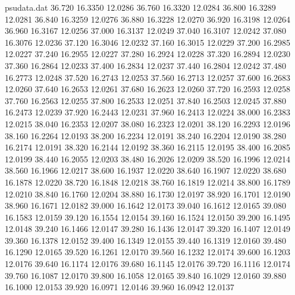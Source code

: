 \begin{filecontents*}{psudata.dat}
36.720 16.3350 12.0286
36.760 16.3320 12.0284
36.800 16.3289 12.0281
36.840 16.3259 12.0276
36.880 16.3228 12.0270
36.920 16.3198 12.0264
36.960 16.3167 12.0256
37.000 16.3137 12.0249
37.040 16.3107 12.0242
37.080 16.3076 12.0236
37.120 16.3046 12.0232
37.160 16.3015 12.0229
37.200 16.2985 12.0227
37.240 16.2955 12.0227
37.280 16.2924 12.0228
37.320 16.2894 12.0230
37.360 16.2864 12.0233
37.400 16.2834 12.0237
37.440 16.2804 12.0242
37.480 16.2773 12.0248
37.520 16.2743 12.0253
37.560 16.2713 12.0257
37.600 16.2683 12.0260
37.640 16.2653 12.0261
37.680 16.2623 12.0260
37.720 16.2593 12.0258
37.760 16.2563 12.0255
37.800 16.2533 12.0251
37.840 16.2503 12.0245
37.880 16.2473 12.0239
37.920 16.2443 12.0231
37.960 16.2413 12.0224
38.000 16.2383 12.0215
38.040 16.2353 12.0207
38.080 16.2323 12.0201
38.120 16.2293 12.0196
38.160 16.2264 12.0193
38.200 16.2234 12.0191
38.240 16.2204 12.0190
38.280 16.2174 12.0191
38.320 16.2144 12.0192
38.360 16.2115 12.0195
38.400 16.2085 12.0199
38.440 16.2055 12.0203
38.480 16.2026 12.0209
38.520 16.1996 12.0214
38.560 16.1966 12.0217
38.600 16.1937 12.0220
38.640 16.1907 12.0220
38.680 16.1878 12.0220
38.720 16.1848 12.0218
38.760 16.1819 12.0214
38.800 16.1789 12.0210
38.840 16.1760 12.0204
38.880 16.1730 12.0197
38.920 16.1701 12.0190
38.960 16.1671 12.0182
39.000 16.1642 12.0173
39.040 16.1612 12.0165
39.080 16.1583 12.0159
39.120 16.1554 12.0154
39.160 16.1524 12.0150
39.200 16.1495 12.0148
39.240 16.1466 12.0147
39.280 16.1436 12.0147
39.320 16.1407 12.0149
39.360 16.1378 12.0152
39.400 16.1349 12.0155
39.440 16.1319 12.0160
39.480 16.1290 12.0165
39.520 16.1261 12.0170
39.560 16.1232 12.0174
39.600 16.1203 12.0176
39.640 16.1174 12.0176
39.680 16.1145 12.0176
39.720 16.1116 12.0174
39.760 16.1087 12.0170
39.800 16.1058 12.0165
39.840 16.1029 12.0160
39.880 16.1000 12.0153
39.920 16.0971 12.0146
39.960 16.0942 12.0137
\end{filecontents*}
\documentclass[11pt,a4paper]{article}
\usepackage[margin=1.9cm,top=2.1cm,bottom=2.1cm]{geometry}
\usepackage{amsmath,amssymb}
\usepackage[siunitx,american]{circuitikz}
\usepackage{pgfplots}
\pgfplotsset{compat=1.16}
\usetikzlibrary{arrows.meta,positioning,shapes.geometric,calc,fit,backgrounds,external}
\usepackage{booktabs,tabularx,array}
\usepackage{tcolorbox}
\usepackage{pdflscape}
\usepackage{float}
\usepackage{enumitem}
\usepackage{fancyhdr}
\usepackage{pdfpages}
\usepackage[colorlinks,linkcolor=blue!50!black,urlcolor=blue!50!black]{hyperref}

\setlength{\parindent}{0pt}
\setlength{\parskip}{4pt}
\pagestyle{fancy}
\fancyhf{}
\cfoot{\small\thepage}
\renewcommand{\headrulewidth}{0.3pt}

